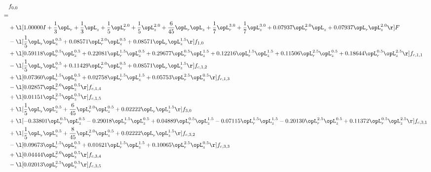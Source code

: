\begin{alignat}{2} 
\label{eq:f_00_2} 
& f_{0,0} \nonumber \\ 
 = \\ 
& + \l[  1.00000 I + \frac{1}{3} \opL_r + \frac{1}{3} \opL_z + \frac{1}{5} \opL_r^{2.0} + \frac{1}{5} \opL_z^{2.0} + \frac{6}{45} \opL_r \opL_z + \frac{1}{7} \opL_r^{3.0} + \frac{1}{7} \opL_z^{3.0} +  0.07937 \opL_r^{2.0} \opL_z +  0.07937 \opL_r \opL_z^{2.0}  \r] F \nonumber \\ 
& - \l[ \frac{1}{5} \opL_r \opL_z^{0.5} +  0.08571 \opL_r^{2.0} \opL_z^{0.5} +  0.08571 \opL_r \opL_z^{1.5}  \r] f_{1,0} \nonumber \\ 
& + \l[  0.59118 \opL_r^{0.5} \opL_z^{0.5} +  0.22081 \opL_r^{1.5} \opL_z^{0.5} +  0.29677 \opL_r^{0.5} \opL_z^{1.5} +  0.12216 \opL_r^{1.5} \opL_z^{1.5} +  0.11506 \opL_r^{2.5} \opL_z^{0.5} +  0.18644 \opL_r^{0.5} \opL_z^{2.5}  \r] f_{c,1,1} \nonumber \\ 
& - \l[ \frac{1}{5} \opL_r \opL_z^{0.5} +  0.11429 \opL_r^{2.0} \opL_z^{0.5} +  0.08571 \opL_r \opL_z^{1.5}  \r] f_{c,1,2} \nonumber \\ 
& + \l[  0.07360 \opL_r^{1.5} \opL_z^{0.5} +  0.02758 \opL_r^{1.5} \opL_z^{1.5} +  0.05753 \opL_r^{2.5} \opL_z^{0.5}  \r] f_{c,1,3} \nonumber \\ 
& - \l[  0.02857 \opL_r^{2.0} \opL_z^{0.5}  \r] f_{c,1,4} \nonumber \\ 
& + \l[  0.01151 \opL_r^{2.5} \opL_z^{0.5}  \r] f_{c,1,5} \nonumber \\ 
& + \l[ \frac{1}{5} \opL_r \opL_z^{0.5} + \frac{6}{45} \opL_r^{2.0} \opL_z^{0.5} +  0.02222 \opL_r \opL_z^{1.5}  \r] f_{3,0} \nonumber \\ 
& + \l[  -0.33801 \opL_r^{0.5} \opL_z^{0.5}   -0.29018 \opL_r^{1.5} \opL_z^{0.5} +  0.04889 \opL_r^{0.5} \opL_z^{1.5}   -0.07115 \opL_r^{1.5} \opL_z^{1.5}   -0.20130 \opL_r^{2.5} \opL_z^{0.5} +  0.11372 \opL_r^{0.5} \opL_z^{2.5}  \r] f_{c,3,1} \nonumber \\ 
& + \l[ \frac{1}{5} \opL_r \opL_z^{0.5} + \frac{8}{45} \opL_r^{2.0} \opL_z^{0.5} +  0.02222 \opL_r \opL_z^{1.5}  \r] f_{c,3,2} \nonumber \\ 
& - \l[  0.09673 \opL_r^{1.5} \opL_z^{0.5} +  0.01621 \opL_r^{1.5} \opL_z^{1.5} +  0.10065 \opL_r^{2.5} \opL_z^{0.5}  \r] f_{c,3,3} \nonumber \\ 
& + \l[  0.04444 \opL_r^{2.0} \opL_z^{0.5}  \r] f_{c,3,4} \nonumber \\ 
& - \l[  0.02013 \opL_r^{2.5} \opL_z^{0.5}  \r] f_{c,3,5} \nonumber \\ 

\end{alignat}

